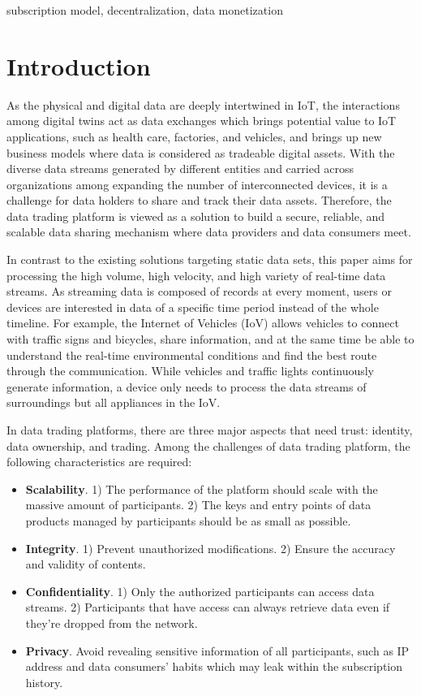 \documentclass[10pt, conference, compsocconf]{IEEEtran}
\begin{document}
\begin{IEEEkeywords}
subscription model, decentralization, data monetization
\end{IEEEkeywords}

\section{Introduction}
As the physical and digital data are deeply intertwined in IoT, the interactions among digital twins act as data exchanges\cite{digitaltwin} which brings potential value to IoT applications, such as health care\cite{healthCare}, factories, and vehicles\cite{AutonomousDriving}, and brings up new business models where data is considered as tradeable digital assets. With the diverse data streams generated by different entities and carried across organizations among expanding the number of interconnected devices, it is a challenge for data holders to share and track their data assets. Therefore, the data trading platform is viewed as a solution to build a secure, reliable, and scalable data sharing mechanism where data providers and data consumers meet.

In contrast to the existing solutions targeting static data sets\cite{DIaas, MARSA}, this paper aims for processing the high volume, high velocity, and high variety of real-time data streams\cite{BigData}. As streaming data is composed of records at every moment, users or devices are interested in data of a specific time period instead of the whole timeline. For example, the Internet of Vehicles (IoV) allows vehicles to connect with traffic signs and bicycles, share information, and at the same time be able to understand the real-time environmental conditions and find the best route through the communication. While vehicles and traffic lights continuously generate information, a device only needs to process the data streams of surroundings but all appliances in the IoV.

In data trading platforms, there are three major aspects that need trust: identity, data ownership, and trading.
Among the challenges of data trading platform\cite{BigDataMarket}, the following characteristics are required:
\begin{itemize}
    \item \textbf{Scalability}.
1) The performance of the platform should scale with the massive amount of participants. 2) The keys and entry points of data products managed by participants should be as small as possible.
    \item \textbf{Integrity}. 1) Prevent unauthorized modifications. 2) Ensure the accuracy and validity of contents.
    \item \textbf{Confidentiality}.
1) Only the authorized participants can access data streams. 2) Participants that have access can always retrieve data even if they're dropped from the network.
    \item \textbf{Privacy}. Avoid revealing sensitive information of all participants, such as IP address and data consumers' habits which may leak within the subscription history.
\end{itemize}
\end{document}
